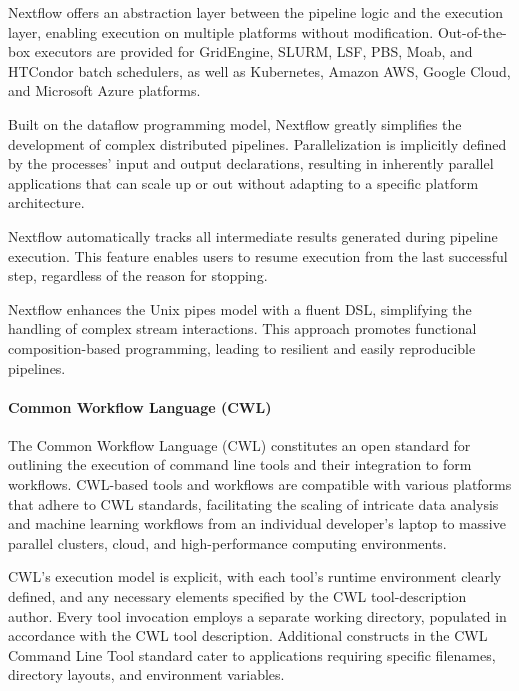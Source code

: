                 Nextflow offers an abstraction layer between the pipeline logic and the execution layer, enabling execution on multiple platforms without modification. Out-of-the-box executors are provided for GridEngine, SLURM, LSF, PBS, Moab, and HTCondor batch schedulers, as well as Kubernetes, Amazon AWS, Google Cloud, and Microsoft Azure platforms.
                
                Built on the dataflow programming model, Nextflow greatly simplifies the development of complex distributed pipelines. Parallelization is implicitly defined by the processes' input and output declarations, resulting in inherently parallel applications that can scale up or out without adapting to a specific platform architecture.
                
                Nextflow automatically tracks all intermediate results generated during pipeline execution. This feature enables users to resume execution from the last successful step, regardless of the reason for stopping.
                
                Nextflow enhances the Unix pipes model with a fluent DSL, simplifying the handling of complex stream interactions. This approach promotes functional composition-based programming, leading to resilient and easily reproducible pipelines.
                
            \paragraph*{Common Workflow Language (CWL)}
                The Common Workflow Language (CWL) constitutes an open standard for outlining the execution of command line tools and their integration to form workflows. CWL-based tools and workflows are compatible with various platforms that adhere to CWL standards, facilitating the scaling of intricate data analysis and machine learning workflows from an individual developer's laptop to massive parallel clusters, cloud, and high-performance computing environments\cite{crusoe2022methods}.
    
                CWL's execution model is explicit, with each tool's runtime environment clearly defined, and any necessary elements specified by the CWL tool-description author. Every tool invocation employs a separate working directory, populated in accordance with the CWL tool description. Additional constructs in the CWL Command Line Tool standard cater to applications requiring specific filenames, directory layouts, and environment variables.
    
